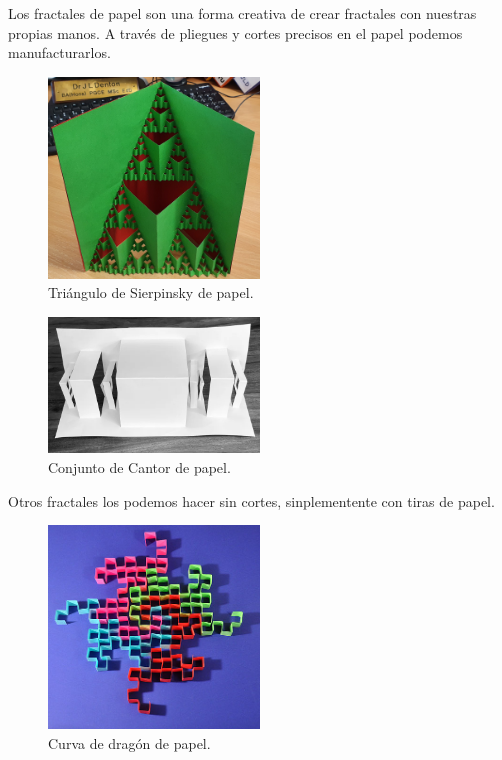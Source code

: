 \noindent Los fractales de papel son una forma creativa de crear fractales con nuestras propias manos. A través de pliegues y cortes precisos en el papel podemos manufacturarlos.\\

\begin{figure}[H]
    \centering
    \includegraphics[width=0.5\textwidth]{figures/paper-sierspinsky-triangle.jpeg}
    \caption{Triángulo de Sierpinsky de papel.}
    \label{fig:paper-sierspinsky-triangle}
\end{figure}

\begin{figure}[H]
    \centering
    \includegraphics[width=0.5\textwidth]{figures/paper-cantor-set.jpg}
    \caption{Conjunto de Cantor de papel.}
    \label{fig:paper-cantor-set}
\end{figure}

\noindent Otros fractales los podemos hacer sin cortes, sinplementente con tiras de papel.\\

\begin{figure}[H]
    \centering
    \includegraphics[width=0.5\textwidth]{figures/paper-dragon-curve.jpg}
    \caption{Curva de dragón de papel.}
    \label{fig:paper-dragon-curve}
\end{figure}